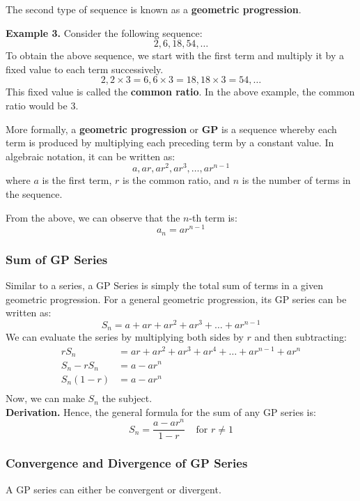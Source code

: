 \documentclass[12pt]{article}
\begin{document}
The second type of sequence is known as a \textbf{geometric progression}.

\textbf{Example 3.} Consider the following sequence:
\[
	2, 6, 18, 54, \dots
\]
To obtain the above sequence, we start with the first term and multiply it by a fixed value to each term successively.
\[
	2, 2 \times 3 = 6, 6 \times 3 = 18, 18 \times 3 = 54, \dots
\]
This fixed value is called the \textbf{common ratio}. In the above example, the common ratio would be 3.

More formally, a \textbf{geometric progression} or \textbf{GP} is a sequence whereby each term is produced by multiplying each preceding term by a constant value. In algebraic notation, it can be written as:
\[
	a, ar, ar^2, ar^3, \dots, ar^{n-1}
\]
where $a$ is the first term, $r$ is the common ratio, and $n$ is the number of terms in the sequence.

From the above, we can observe that the $n$-th term is:
\[
	a_n = ar^{n-1}
\]

\subsubsection{Sum of GP Series}

Similar to a series, a GP Series is simply the total sum of terms in a given geometric progression. For a general geometric progression, its GP series can be written as:
\[
	S_n = a + ar + ar^2 + ar^3 + \dots + ar^{n-1}
\]
We can evaluate the series by multiplying both sides by $r$ and then subtracting:
\begin{align*}
	rS_n       & = ar + ar^2 + ar^3 + ar^4 + \dots + ar^{n-1} + ar^n        \\
	S_n - rS_n & = a - ar^n                                                 \\
	S_n(1 - r) & = a - ar^n                                                 \\
\end{align*}
Now, we can make $S_n$ the subject.\\
\textbf{Derivation.} Hence, the general formula for the sum of any GP series is:
\[
	S_n = \frac{a - ar^n}{1 - r}   \;\;\;\;   \text{for } r \neq 1
\]

\subsubsection{Convergence and Divergence of GP Series}
A GP series can either be convergent or divergent.
\end{document}
